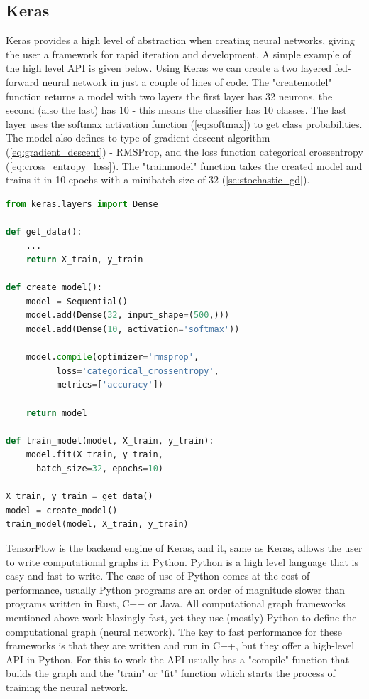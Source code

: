 \documentclass[times, utf8, diplomski]{fer}
\begin{document}
\subsection{Keras}
\label{se:keras}

Keras provides a high level of abstraction when creating neural networks, giving the user a framework for rapid iteration and development. A simple example of the high level API is given below. Using Keras we can create a two layered fed-forward neural network in just a couple of lines of code. The "create\textunderscore model" function returns a model with two layers the first layer has 32 neurons, the second (also the last) has 10 - this means the classifier has 10 classes. The last layer uses the softmax activation function (\ref{eq:softmax}) to get class probabilities. The model also defines to type of gradient descent algorithm (\ref{eq:gradient_descent}) - RMSProp, and the loss function categorical crossentropy (\ref{eq:cross_entropy_loss}). The "train\textunderscore model" function takes the created model and trains it in 10 epochs with a minibatch size of 32 (\ref{se:stochastic_gd}).




\begin{lstlisting}[language=Python, caption=Keras high level API example]
from keras.layers import Dense

def get_data():
	...
	return X_train, y_train

def create_model():
    model = Sequential()
    model.add(Dense(32, input_shape=(500,)))
    model.add(Dense(10, activation='softmax'))
    
    model.compile(optimizer='rmsprop',
          loss='categorical_crossentropy',
          metrics=['accuracy'])
          
    return model
    
def train_model(model, X_train, y_train):
	model.fit(X_train, y_train,
	  batch_size=32, epochs=10)
        
X_train, y_train = get_data()
model = create_model()
train_model(model, X_train, y_train)

\end{lstlisting}

TensorFlow is the backend engine of Keras, and it, same as Keras, allows the user to write computational graphs in Python. Python is a high level language that is easy and fast to write. The ease of use of Python comes at the cost of performance, usually Python programs are an order of magnitude slower than programs written in Rust, C++ or Java. All computational graph frameworks mentioned above work blazingly fast, yet they use (mostly) Python to define the computational graph (neural network). The key to fast performance for these frameworks is that they are written and run in C++, but they offer a high-level API in Python. For this to work the API usually has a "compile" function that builds the graph and the "train" or "fit" function which starts the process of training the neural network.
\end{document}
